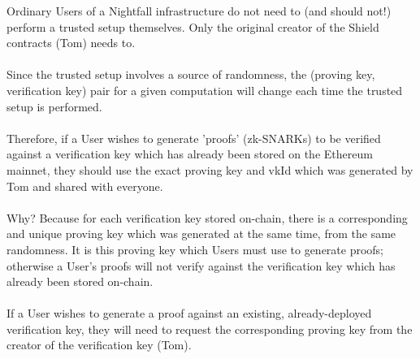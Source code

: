 \documentclass{article}
\begin{document}
Ordinary Users of a Nightfall infrastructure do not need to (and should not!) perform a trusted setup themselves. Only the original creator of the Shield contracts (Tom) needs to.\\
\\
Since the trusted setup involves a source of randomness, the (proving key, verification key) pair for a given computation will change each time the trusted setup is performed.\\
\\
Therefore, if a User wishes to generate 'proofs' (zk-SNARKs) to be verified against a verification key which has already been stored on the Ethereum mainnet, they should use the exact proving key and vkId which was generated by Tom and shared with everyone.\\
\\
Why? Because for each verification key stored on-chain, there is a corresponding and unique proving key which was generated at the same time, from the same randomness. It is this proving key which Users must use to generate proofs; otherwise a User's proofs will not verify against the verification key which has already been stored on-chain.\\
\\
If a User wishes to generate a proof against an existing, already-deployed verification key, they will need to request the corresponding proving key from the creator of the verification key (Tom).
\end{document}
